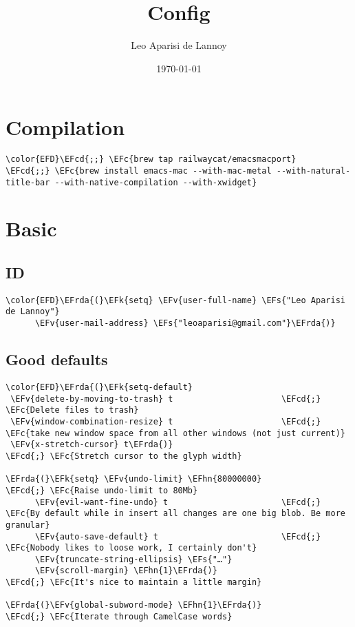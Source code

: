 \documentclass[12pt]{article}
\author{Leo Aparisi de Lannoy}
\date{\today}
\title{Config}
\theoremstyle{plain}%
\theoremstyle{definition}
\theoremstyle{remark}
\newcommand{\EFc}[1]{\textcolor{EFc}{#1}} %
\newcommand{\EFcd}[1]{\textcolor{EFcd}{#1}} %
\newcommand{\EFs}[1]{\textcolor{EFs}{#1}} %
\newcommand{\EFk}[1]{\textcolor{EFk}{#1}} %
\newcommand{\EFv}[1]{\textcolor{EFv}{#1}} %
\newcommand{\EFhn}[1]{\textcolor{EFhn}{\textbf{#1}}} %
\newcommand{\EFrda}[1]{\textcolor{EFrda}{#1}} %
\begin{document}
\maketitle
\tableofcontents

\section{Compilation}
\label{sec:orgc8d9781}
\begin{Code}
\begin{Verbatim}
\color{EFD}\EFcd{;;} \EFc{brew tap railwaycat/emacsmacport}
\EFcd{;;} \EFc{brew install emacs-mac --with-mac-metal --with-natural-title-bar --with-native-compilation --with-xwidget}
\end{Verbatim}
\end{Code}
\section{Basic}
\label{sec:org23109f6}
\subsection{ID}
\label{sec:orgf50500b}
\begin{Code}
\begin{Verbatim}
\color{EFD}\EFrda{(}\EFk{setq} \EFv{user-full-name} \EFs{"Leo Aparisi de Lannoy"}
      \EFv{user-mail-address} \EFs{"leoaparisi@gmail.com"}\EFrda{)}
\end{Verbatim}
\end{Code}
\subsection{Good defaults}
\label{sec:org2e5475a}
\begin{Code}
\begin{Verbatim}
\color{EFD}\EFrda{(}\EFk{setq-default}
 \EFv{delete-by-moving-to-trash} t                      \EFcd{;} \EFc{Delete files to trash}
 \EFv{window-combination-resize} t                      \EFcd{;} \EFc{take new window space from all other windows (not just current)}
 \EFv{x-stretch-cursor} t\EFrda{)}                              \EFcd{;} \EFc{Stretch cursor to the glyph width}

\EFrda{(}\EFk{setq} \EFv{undo-limit} \EFhn{80000000}                         \EFcd{;} \EFc{Raise undo-limit to 80Mb}
      \EFv{evil-want-fine-undo} t                       \EFcd{;} \EFc{By default while in insert all changes are one big blob. Be more granular}
      \EFv{auto-save-default} t                         \EFcd{;} \EFc{Nobody likes to loose work, I certainly don't}
      \EFv{truncate-string-ellipsis} \EFs{"…"}
      \EFv{scroll-margin} \EFhn{1}\EFrda{)}                            \EFcd{;} \EFc{It's nice to maintain a little margin}

\EFrda{(}\EFv{global-subword-mode} \EFhn{1}\EFrda{)}                           \EFcd{;} \EFc{Iterate through CamelCase words}
\end{Verbatim}
\end{Code}
\end{document}
